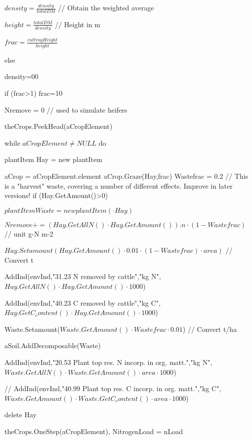 \documentclass[%
]{scrartcl}
\begin{document}
    \quad   $density=\tfrac{density}{totalDM}$  		// Obtain the weighted average
    
    \quad   $height=\tfrac{totalDM}{density}  $		// Height in m
   
    \quad   $frac=\tfrac{cuttingHeight}{height}$
   
   else
   
    \quad   density=00
    
   if (frac>1) frac=10

   \quad   Nremove = 0            // used to simulate heifers

   theCrops.PeekHead(aCropElement)
   
   while $aCropElement\ne NULL$ do
   
      plantItem   Hay = new plantItem
   
   aCrop = aCropElement.element
      aCrop.Graze(Hay,frac)
        Wastefrac = 0.2                    // This is a "harvest" waste, covering a number of different effects. Improve in later versions!
      if (Hay.GetAmount()>0)
      
    \quad      $ plantItem   Waste = new plantItem( \cdot Hay)$
    
 \quad     $ Nremove += (Hay.GetAllN() \cdot Hay.GetAmount()).n \cdot (1-Wastefrac)  $    // unit g-N m-2
   
\quad     	$Hay.Setamount(Hay.GetAmount() \cdot 0.01 \cdot (1-Wastefrac) \cdot area) $     // Convert t
      
\quad     AddInd(envInd,"31.23 N removed by cattle","kg N",$Hay.GetAllN() \cdot Hay.GetAmount() \cdot 1000$)
      
\quad     AddInd(envInd,"40.23 C removed by cattle","kg C",$Hay.GetC_content() \cdot Hay.GetAmount() \cdot 1000$)

     
\quad      Waste.Setamount($Waste.GetAmount() \cdot Wastefrac \cdot 0.01$)         // Convert t/ha
   
  \quad      aSoil.AddDecomposable(Waste)
 
  
\quad  	   AddInd(envInd,"20.53 Plant top res. N incorp. in org. matt.","kg N",$Waste.GetAllN() \cdot Waste.GetAmount() \cdot area \cdot 1000$)

\quad   //		   AddInd(envInd,"40.99 Plant top res. C incorp. in org. matt.","kg C",$Waste.GetAmount() \cdot Waste.GetC_content() \cdot area \cdot 1000$)
      


   	delete Hay

      theCrops.OneStep(aCropElement),    NitrogenLoad = nLoad
\end{document}
